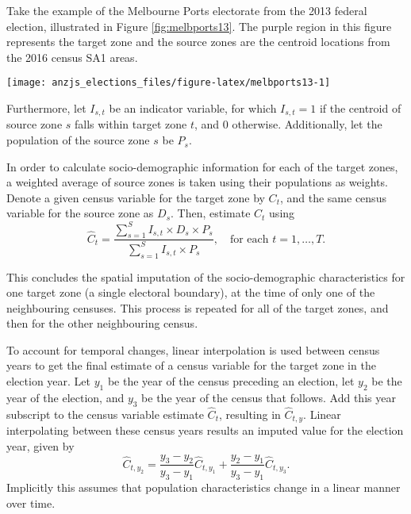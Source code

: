 \documentclass[
  times, doublespace]{anzsauth}
\let\origfigure\figure
\let\endorigfigure\endfigure
\renewenvironment{figure}[1][2] {
    \expandafter\origfigure\expandafter[htbp]
} {
    \endorigfigure
}
\begin{document}
Take the example of the Melbourne Ports electorate from the 2013 federal election, illustrated in Figure \ref{fig:melbports13}. The purple region in this figure represents the target zone and the source zones are the centroid locations from the 2016 census SA1 areas.

\begin{figure}[h]

{\centering \texttt{[image: anzjs\_elections\_files/figure-latex/melbports13-1]} 

}

\caption{The electoral boundaries for Melbourne Ports (shown in purple) and surrounding electorates, with centroids for Statistical Area 1 regions from the 2016 census overlaid. The centroids falling within the purple region are attributed to Melbourne Ports.}\label{fig:melbports13}
\end{figure}

Furthermore, let \(I_{s,t}\) be an indicator variable, for which \(I_{s,t} = 1\) if the centroid of source zone \(s\) falls within target zone \(t\), and \(0\) otherwise. Additionally, let the population of the source zone \(s\) be \(P_{s}\).

In order to calculate socio-demographic information for each of the target zones, a weighted average of source zones is taken using their populations as weights. Denote a given census variable for the target zone by \(C_t\), and the same census variable for the source zone as \(D_s\). Then, estimate \(C_t\) using
\[
  \hat{C}_t = \frac{\sum_{s=1}^{S}{I_{s,t} \times D_s \times P_s}}%
  {\sum_{s=1}^{S}{I_{s,t} \times P_s}},
  \quad\text{for each $t=1,\dots,T$}.
\]

This concludes the spatial imputation of the socio-demographic characteristics for one target zone (a single electoral boundary), at the time of only one of the neighbouring censuses. This process is repeated for all of the target zones, and then for the other neighbouring census.

\enlargethispage*{0.5cm}

To account for temporal changes, linear interpolation is used between census years to get the final estimate of a census variable for the target zone in the election year. Let \(y_1\) be the year of the census preceding an election, let \(y_2\) be the year of the election, and \(y_3\) be the year of the census that follows. Add this year subscript to the census variable estimate \(\hat{C}_t\), resulting in \(\hat{C}_{t,y}\). Linear interpolating between these census years results an imputed value for the election year, given by
\[
  \hat{C}_{t,y_2} = \frac{y_3-y_2}{y_3-y_1} \hat{C}_{t,y_1} +
    \frac{y_2-y_1}{y_3-y_1} \hat{C}_{t,y_3}.
\]
Implicitly this assumes that population characteristics change in a linear manner over time.
\end{document}
